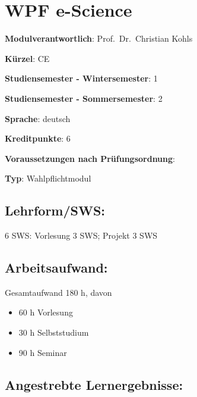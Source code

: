 \chapter{WPF e-Science}\label{wpf-e-science}

\begin{modulHead}
\textbf{Modulverantwortlich}: Prof.~Dr.~Christian
Kohls
\end{modulHead}
\begin{modulHead}
\textbf{Kürzel}:
CE
\end{modulHead}
\begin{modulHead}
\textbf{Studiensemester -
Wintersemester}:
1
\end{modulHead}
\begin{modulHead}
\textbf{Studiensemester -
Sommersemester}: 2
\end{modulHead}
\begin{modulHead}
\textbf{Sprache}:
deutsch
\end{modulHead}
\begin{modulHead}
\textbf{Kreditpunkte}:
6
\end{modulHead}
\begin{modulHead}
\textbf{Voraussetzungen nach
Prüfungsordnung}: 
\end{modulHead}
\begin{modulHead}
\textbf{Typ}:
Wahlpflichtmodul
\end{modulHead}


\section*{Lehrform/SWS:}\label{lehrformsws-15}

6 SWS: Vorlesung 3 SWS; Projekt 3 SWS

\section*{Arbeitsaufwand:}\label{arbeitsaufwand-20}

Gesamtaufwand 180 h, davon

\begin{itemize}
\tightlist
\item
  60 h Vorlesung
\item
  30 h Selbststudium
\item
  90 h Seminar
\end{itemize}

\section*{Angestrebte
Lernergebnisse:}\label{angestrebte-lernergebnisse-14}

